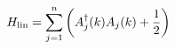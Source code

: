 \begin{equation}
H_{\rm lin}=\sum_{j=1}^n\left(A^{\dagger}_j(k)A_j(k)+{1\over 2}\right)
\label{hachelin}
\end{equation} 
